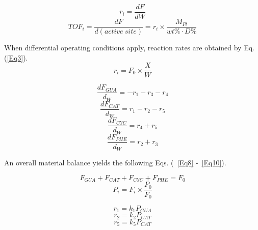 \begin{equation} \label{Eq1}
r_i=\frac{dF}{dW}
\end{equation}
\begin{equation} \label{Eq2}
TOF_i=\frac{dF}{d\left(active~site\right)}=r_i \times \frac{M_{Pt}}{wt\% \cdot D\%}
\end{equation}


When differential operating conditions apply, reaction rates are obtained by Eq. (\ref{Eq3}).
\begin{equation} \label{Eq3}
r_i=F_{0} \times \frac{X}{W}
\end{equation}


\begin{equation} \label{Eq4}
\frac{dF_{GUA}}{d_{W}}=-r_1-r_3-r_4
\end{equation}
\begin{equation} \label{Eq5}
\frac{dF_{CAT}}{d_{W}}=r_1-r_2-r_5
\end{equation}
\begin{equation} \label{Eq6}
\frac{dF_{CYC}}{d_{W}}=r_4+r_5
\end{equation}
\begin{equation} \label{Eq7}
\frac{dF_{PHE}}{d_{W}}=r_2+r_3
\end{equation}

An overall material balance yields the following Eqs. (~\ref{Eq8} -~\ref{Eq10}).

\begin{equation} \label{Eq8}
F_{GUA}+F_{CAT}+F_{CYC}+F_{PHE}=F_{0}
\end{equation}
\begin{equation} \label{Eq10}
P_{i}=F_{i} \times \frac{P_{0}}{F_{0}}
\end{equation}


\begin{equation} \label{Eq11}
r_1=k_1 P_{GUA}
\end{equation}
\begin{equation} \label{Eq12}
r_2=k_2 P_{CAT}
\end{equation}
\begin{equation} \label{Eq13}
r_5=k_5 P_{CAT}
\end{equation}

